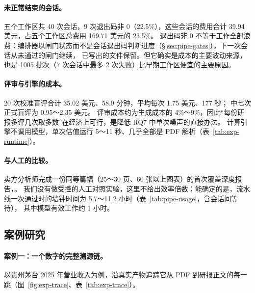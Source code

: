 \paragraph{未正常结束的会话。}五个工作区共 40 次会话，9 次退出码非 0（22.5\%），这些会话的费用合计 39.94 美元，占五个工作区总费用 169.71 美元的 23.5\%。
退出码非 0 不等于工作全部浪费：编排器以闸门状态而不是会话退出码判断进度（\S\ref{sec:pipe-gates}），下一次会话从未通过的闸门继续，
已写出的文件保留。但它确实是成本的主要波动来源，也是 1005 批次（7 次会话中最多 2 次失败）比早期工作区便宜的主要原因。

\paragraph{评审与引擎的成本。}20 次校准盲评合计 35.02 美元、58.9 分钟，平均每次 1.75 美元、177 秒； 中七次正式盲评为 0.95～2.35 美元。
评审成本约为生成成本的 4\%～9\%，因此“每份研报多评几次取多数”在经济上可行，是降低 RQ7 中单次噪声的直接办法。
计算引擎不调用模型，单次估值运行 5～11 秒、几乎全部是 PDF 解析（表~\ref{tab:exp-runtime}）。

\paragraph{与人工的比较。}卖方分析师完成一份同等篇幅（25～30 页、60 张以上图表）的首次覆盖深度报告，。
我们没有做受控的人工对照实验，这里不给出效率倍数；能确定的是，流水线一次通过时的墙钟时间为 5.7～11.2 小时（表~\ref{tab:pipe-usage}，含会话间等待），
其中模型有效工作约 1 小时。

\subsection{案例研究}
\label{sec:exp-case}

\paragraph{案例一：一个数字的完整溯源链。}以贵州茅台 2025 年营业收入为例，沿真实产物追踪它从 PDF 到研报正文的每一跳（图~\ref{fig:exp-trace}、表~\ref{tab:exp-trace}）。


